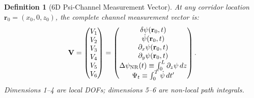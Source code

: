 \documentclass[aps,prd,twocolumn,superscriptaddress,nofootinbib]{revtex4-2}
\newtheorem{definition}{Definition}
\begin{document}
\begin{definition}[6D Psi-Channel Measurement Vector]
\label{def:6D}
At any corridor location $\mathbf{r}_0 = (x_0, 0, z_0)$, the complete
channel measurement vector is:
\begin{equation}
\mathbf{V} = \begin{pmatrix} V_1 \\ V_2 \\ V_3 \\ V_4 \\ V_5 \\ V_6 \end{pmatrix}
= \begin{pmatrix}
\delta\psi(\mathbf{r}_0, t) \\
\dot\psi(\mathbf{r}_0, t) \\
\partial_x \psi(\mathbf{r}_0, t) \\
\partial_y \psi(\mathbf{r}_0, t) \\
\Delta\psi_{\rm NR}(t) \equiv \int_0^L \partial_z\psi \, dz \\
\Psi_t \equiv \int_0^T \dot\psi \, dt'
\end{pmatrix}.
\label{eq:6D-vector}
\end{equation}
Dimensions 1--4 are local DOFs; dimensions 5--6 are non-local path integrals.
\end{definition}
\end{document}
